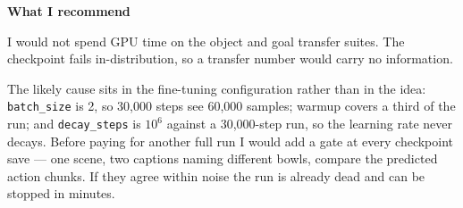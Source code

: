 \documentclass[11pt,a4paper]{article}
\newcommand{\heading}[1]{\vspace{4pt}\noindent\textbf{#1}\par\vspace{1pt}}
\begin{document}
\heading{What I recommend}
I would not spend GPU time on the object and goal transfer suites. The
checkpoint fails in-distribution, so a transfer number would carry no
information.

The likely cause sits in the fine-tuning configuration rather than in the idea:
\texttt{batch\_size} is 2, so 30{,}000 steps see 60{,}000 samples; warmup covers
a third of the run; and \texttt{decay\_steps} is $10^{6}$ against a
30{,}000-step run, so the learning rate never decays. Before paying for another
full run I would add a gate at every checkpoint save --- one scene, two captions
naming different bowls, compare the predicted action chunks. If they agree
within noise the run is already dead and can be stopped in minutes.
\end{document}
